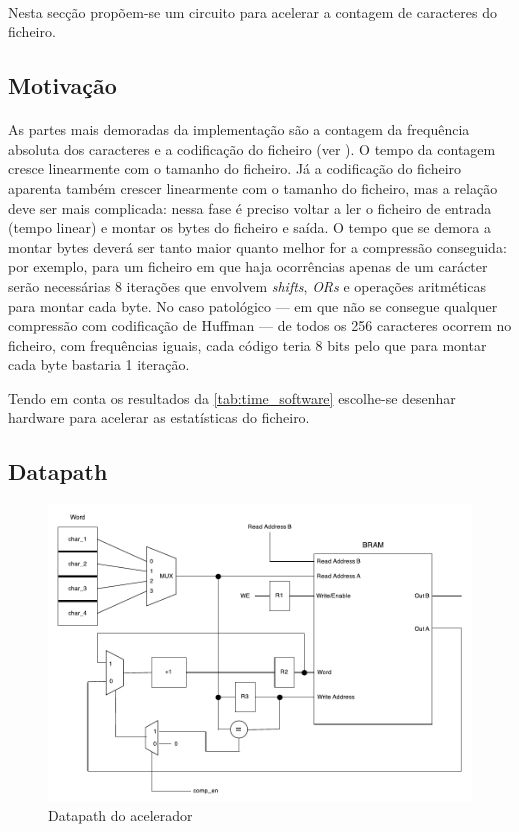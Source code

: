 \paragraph{} Nesta secção propõem-se um circuito para acelerar a contagem de caracteres do ficheiro.

\subsection{Motivação}
  \paragraph{} As partes mais demoradas da implementação são a contagem da frequência absoluta dos caracteres e a codificação do ficheiro (ver ). O tempo da contagem cresce linearmente com o tamanho do ficheiro. Já a codificação do ficheiro aparenta também crescer linearmente com o tamanho do ficheiro, mas a relação deve ser mais complicada: nessa fase é preciso voltar a ler o ficheiro de entrada (tempo linear) e montar os bytes do ficheiro e saída. O tempo que se demora a montar bytes deverá ser tanto maior quanto melhor for a compressão conseguida: por exemplo, para um ficheiro em que haja ocorrências apenas de um carácter serão necessárias 8 iterações que envolvem \textit{shifts}, \textit{ORs} e operações aritméticas para montar cada byte. No caso patológico --- em que não se consegue qualquer compressão com codificação de Huffman --- de todos os 256 caracteres ocorrem no ficheiro, com frequências iguais, cada código teria 8 bits pelo que para montar cada byte bastaria 1 iteração.

  Tendo em conta os resultados da \autoref{tab:time_software} escolhe-se desenhar hardware para acelerar as estatísticas do ficheiro.

  \subsection{Datapath}

  \begin{figure}[h]
    \centerline{
    	\includegraphics[width=0.65\paperwidth]{img/hw_datapath}
    }
    \caption{Datapath do acelerador}
    \label{fig:hw_datapath}
  \end{figure}

